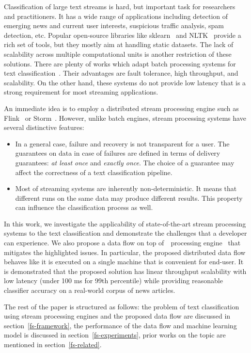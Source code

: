 \label {fs-short-intro}

Classification of large text streams is hard, but important task for researchers and practitioners. It has a wide range of applications including detection of emerging news and current user interests, suspicious traffic analysis, spam detection, etc. Popular open-source libraries like sklearn~\cite{sklearn_api} and NLTK~\cite{bird2009natural} provide a rich set of tools, but they mostly aim at handling static datasets. The lack of scalability across multiple computational units is another restriction of these solutions. There are plenty of works which adapt batch processing systems for text classification~\cite{semberecki2016distributed, svyatkovskiy2016large, baltas2016apache, Nodarakis2016LargeSS}. Their advantages are fault tolerance, high throughput, and scalability. On the other hand, these systems do not provide low latency that is a strong requirement for most streaming applications.

An immediate idea is to employ a distributed stream processing engine such as Flink~\cite{Carbone:2017:SMA:3137765.3137777} or Storm~\cite{apache:storm}. However, unlike batch engines, stream processing systems have several distinctive features: 

\begin{itemize}
    \item In a general case, failure and recovery is not transparent for a user. The guarantees on data in case of failures are defined in terms of delivery guarantees: {\em at least once} and {\em exactly once}. The choice of a guarantee may affect the correctness of a text classification pipeline.
    \item Most of streaming systems are inherently non-deterministic. It means that different runs on the same data may produce different results. This property can influence the classification process as well.
\end{itemize}

In this work, we investigate the applicability of state-of-the-art stream processing systems to the text classification and demonstrate the challenges that a developer can experience. We also propose a data flow on top of~\FlameStream\ processing engine~\cite{we2018beyondmr, we2018adbis} that mitigates the highlighted issues. In particular, the proposed distributed data flow behaves like it is executed on a single machine that is convenient for end-user. It is demonstrated that the proposed solution has linear throughput scalability with low latency (under 100 ms for 99th percentile) while providing reasonable classifier accuracy on a real-world corpus of news articles.

The rest of the paper is structured as follows: the problem of text classification using stream processing engines and the proposed data flow are discussed in section~\ref{fs-framework}, the performance of the data flow and machine learning model is discussed in section~\ref{fs-experiments}, prior works on the topic are mentioned in section~\ref{fs-related}.
